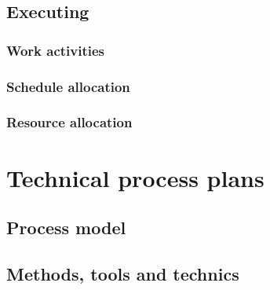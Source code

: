 \documentclass[twocolumn]{article}
\begin{document}
\subsection{Executing}
\subsubsection{Work activities}
\subsubsection{Schedule allocation}
\subsubsection{Resource allocation}

\section{Technical process plans}
\subsection{Process model}
\subsection{Methods, tools and technics}
\end{document}
